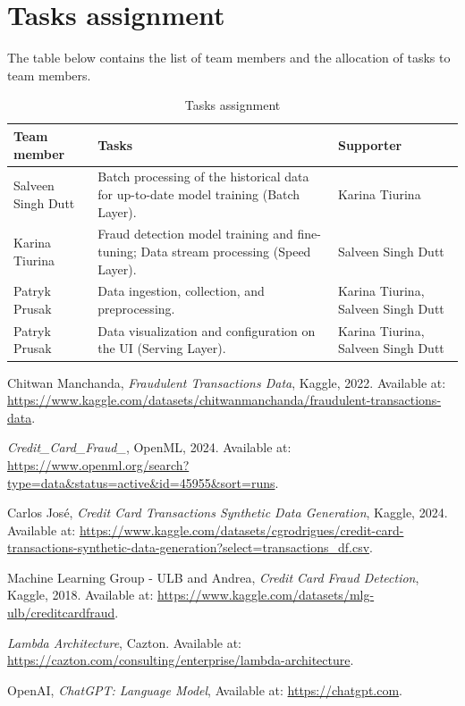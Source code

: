 \documentclass[12pt,a4paper, hidelinks]{article}
\begin{document}
\section{Tasks assignment}

The table below contains the list of team members and the allocation of tasks to team members.

\begin{table}[htbp]
\centering
\begin{tabular}{|p{4cm}|p{6.5cm}|p{4cm}|}
\hline
\textbf{Team member} & \textbf{Tasks} & \textbf{Supporter} \\
\hline
Salveen Singh Dutt & Batch processing of the historical data for up-to-date model training (Batch Layer). & Karina Tiurina \\
\hline
Karina Tiurina & Fraud detection model training and fine-tuning; Data stream processing (Speed Layer). & Salveen Singh Dutt \\
\hline
Patryk Prusak & Data ingestion, collection, and preprocessing. & Karina Tiurina, Salveen Singh Dutt  \\
\hline
Patryk Prusak & Data visualization and configuration on the UI (Serving Layer). & Karina Tiurina, Salveen Singh Dutt \\
\hline
\end{tabular}
\caption{Tasks assignment}
\end{table}

\newpage

\begin{thebibliography}{9}

    Chitwan Manchanda,
    \textit{Fraudulent Transactions Data},
    Kaggle, 2022.
    Available at: \url{https://www.kaggle.com/datasets/chitwanmanchanda/fraudulent-transactions-data}.
    
    \textit{Credit\_Card\_Fraud\_},
    OpenML, 2024.
    Available at: \url{https://www.openml.org/search?type=data&status=active&id=45955&sort=runs}.

    Carlos José,
    \textit{Credit Card Transactions Synthetic Data Generation},
    Kaggle, 2024.
    Available at: \url{https://www.kaggle.com/datasets/cgrodrigues/credit-card-transactions-synthetic-data-generation?select=transactions_df.csv}.
    
    Machine Learning Group - ULB and Andrea,
    \textit{Credit Card Fraud Detection},
    Kaggle, 2018.
    Available at: \url{https://www.kaggle.com/datasets/mlg-ulb/creditcardfraud}.
    

    \textit{Lambda Architecture},
    Cazton.
    Available at: \url{https://cazton.com/consulting/enterprise/lambda-architecture}.

    OpenAI,
    \textit{ChatGPT: Language Model},
    Available at: \url{https://chatgpt.com}.
    
    \end{thebibliography}
\end{document}
